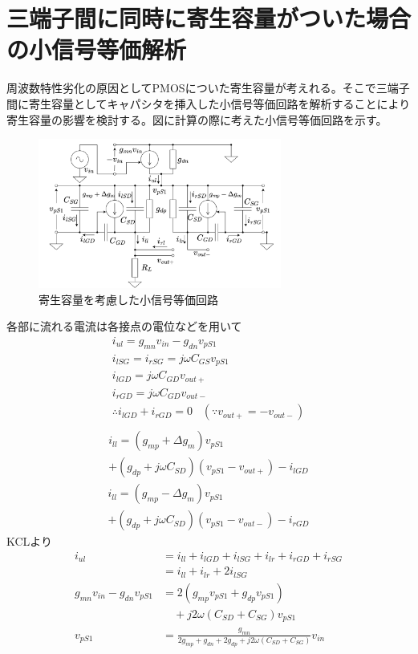 \documentclass[twocolumn]{jsarticle}
\begin{document}
\section{三端子間に同時に寄生容量がついた場合の小信号等価解析}
    周波数特性劣化の原因としてPMOSについた寄生容量が考えれる。そこで三端子間に寄生容量としてキャパシタを挿入した小信号等価回路を解析することにより寄生容量の影響を検討する。図に計算の際に考えた小信号等価回路を示す。
    \begin{figure}[H]
        \begin{center}
            \includegraphics*[width=80mm]{figures/ParasiticCapacitoresEquivalent.png}
            \caption{寄生容量を考慮した小信号等価回路}
            \label{label:paracitic_eq}
        \end{center}
    \end{figure}
    各部に流れる電流は各接点の電位などを用いて  
    \begin{gather*}
        i_{ul}=g_{mn}v_{in}-g_{dn}v_{pS1}   \\
        i_{lSG}=i_{rSG}=j\omega C_{GS}v_{pS1}       \\
        i_{lGD}=j\omega C_{GD}v_{out+}      \\
        i_{rGD}=j\omega C_{GD}v_{out-}      \\
        \therefore i_{lGD}+i_{rGD}=0\;\;\;(\because v_{out+}=-v_{out-})     \\
    \end{gather*}
    \begin{multline*}
        i_{ll} = (g_{mp}+\Delta g_{m})v_{pS1}\\+(g_{dp}+j\omega C_{SD})(v_{pS1}-v_{out+})-i_{lGD}
    \end{multline*}
    \begin{multline*}
        i_{ll} = (g_{mp}-\Delta g_{m})v_{pS1}\\+(g_{dp}+j\omega C_{SD})(v_{pS1}-v_{out-})-i_{rGD}    
    \end{multline*}
    KCLより
    \begin{align*}
        i_{ul} &= i_{ll}+i_{lGD}+i_{lSG}+i_{lr}+i_{rGD}+i_{rSG}    \\
        &= i_{ll}+i_{lr}+2i_{lSG}   \\
        g_{mn}v_{in}-g_{dn}v_{pS1} &= 2 (g_{mp}v_{pS1}+g_{dp}v_{pS1})\\
        & \quad +j2\omega( C_{SD}+C_{SG} ) v_{pS1}   \\
        v_{pS1} &= \frac{g_{mn}}{ 2g_{mp}+g_{dn}+2g_{dp}+j2\omega (C_{SD}+C_{SG}) }v_{in}
    \end{align*}
\end{document}
